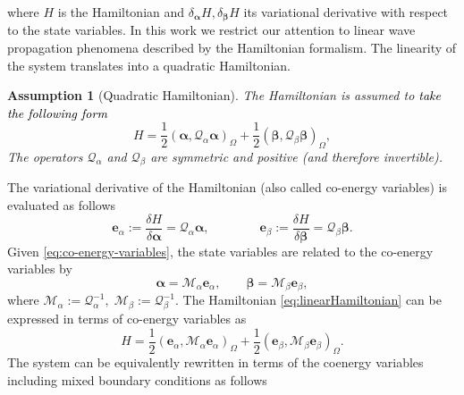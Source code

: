 \documentclass[11pt,a4paper]{article}
\newcommand{\innerproduct}[3][\Omega]{(#2, #3)_{#1}}
\newtheorem{assumption}{Assumption}
\newcommand{\revthree}[1]{{\textcolor{black}{#1}}}
\begin{document}
where $H$ is the Hamiltonian and $\delta_{\bm{\alpha}} H,   \delta_{\bm{\beta}} H$ its variational derivative with respect to the state variables. In this work we restrict our attention to linear wave propagation phenomena described by the Hamiltonian formalism. The linearity of the system translates into a quadratic Hamiltonian.
\begin{assumption}[Quadratic Hamiltonian]
The Hamiltonian is assumed to \revthree{take the following form}
\begin{equation}
    H = \frac{1}{2}\innerproduct{\bm{\alpha}}{\mathcal{Q}_\alpha\bm{\alpha}} + \frac{1}{2}\innerproduct{\bm{\beta}}{\mathcal{Q}_\beta\bm{\beta}},
\label{eq:linearHamiltonian}
\end{equation}
The operators $\mathcal{Q}_\alpha$ and $\mathcal{Q}_\beta$ are symmetric and positive (and therefore invertible).    
\end{assumption}
 The variational derivative of the Hamiltonian (also called co-energy variables) is evaluated as follows \cite{marsdenratiu1999}
\begin{equation}
        \bm{e}_\alpha := \frac{\delta H}{\delta \bm{\alpha}} = \mathcal{Q}_\alpha\bm{\alpha}, \qquad\qquad  \bm{e}_\beta := \frac{\delta H}{\delta \bm{\beta}} = \mathcal{Q}_\beta\bm{\beta}.
\label{eq:co-energy-variables}
\end{equation}
Given \eqref{eq:co-energy-variables}, the state variables are related to the co-energy variables by 
$$\bm{\alpha}=\mathcal{M}_\alpha\bm{e}_\alpha, \qquad \bm{\beta} = \mathcal{M}_\beta \bm{e}_\beta,$$
where $\mathcal{M}_\alpha:=\mathcal{Q}_\alpha^{-1}, \; \mathcal{M}_\beta :=\mathcal{Q}_\beta^{-1}$. The Hamiltonian \eqref{eq:linearHamiltonian} can be expressed in terms of co-energy variables as
\begin{equation}
    H = \frac{1}{2}\innerproduct{\bm{e}_\alpha}{\mathcal{M}_\alpha\bm{e}_\alpha} + \frac{1}{2}\innerproduct{\bm{e}_\beta}{\mathcal{M}_\beta\bm{e}_\beta}.
\label{eq:co-energyHamiltonian}
\end{equation}
The system can be equivalently rewritten in terms of the coenergy variables including mixed boundary conditions as follows
\end{document}

